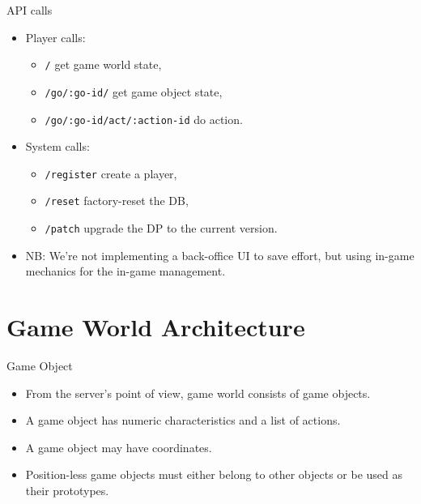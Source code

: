 \documentclass[aspectratio=169,handout,bigger]{beamer}
\begin{document}
\begin{frame}{API calls}
  \begin{itemize}
    \item Player calls:
      \begin{itemize}
        \item \texttt{/} get game world state,
        \item \texttt{/go/:go-id/} get game object state,
        \item \texttt{/go/:go-id/act/:action-id} do action.
      \end{itemize}
    \item System calls:
    \begin{itemize}
      \item \texttt{/register} create a player,
      \item \texttt{/reset} factory-reset the DB,
      \item \texttt{/patch} upgrade the DP to the current version.
    \end{itemize}
    \item NB: We're not implementing a back-office UI to save effort,
          but using in-game mechanics for the in-game management.
  \end{itemize}
\end{frame}


\section{Game World Architecture}


\begin{frame}{Game Object}
  \begin{itemize}
    \item From the server's point of view, game world consists of game objects.
    \item A game object has numeric characteristics and a list of actions.
    \item A game object may have coordinates.
    \item Position-less game objects must either belong to other objects
          or be used as their prototypes.
  \end{itemize}
\end{frame}
\end{document}
